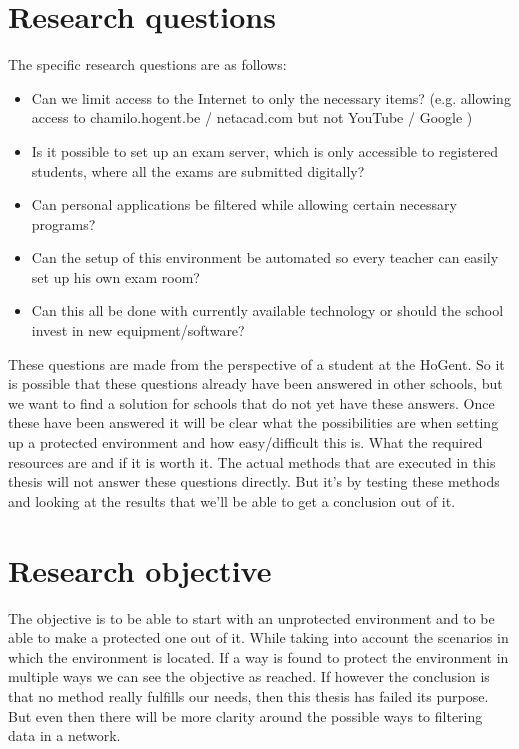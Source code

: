 \section{Research questions}
\label{sec:onderzoeksvraag}
The specific research questions are as follows:
\begin{itemize}
   \item Can we limit access to the Internet to only the necessary items? (e.g. allowing access to chamilo.hogent.be / netacad.com but not YouTube / Google )
   \item Is it possible to set up an exam server, which is only accessible to registered students, where all the exams are submitted digitally?
   \item Can personal applications be filtered while allowing certain necessary programs?
   \item Can the setup of this environment be automated so every teacher can easily set up his own exam room?
   \item Can this all be done with currently available technology or should the school invest in new equipment/software?
\end{itemize}
These questions are made from the perspective of a student at the HoGent. So it is possible that these questions already have been answered in other schools, but we want to find a solution for schools that do not yet have these answers. Once these have been answered it will be clear what the possibilities are when setting up a protected environment and how easy/difficult this is. What the required resources are and if it is worth it. The actual methods that are executed in this thesis will not answer these questions directly. But it's by testing these methods and looking at the results that we'll be able to get a conclusion out of it.
\section{Research objective}
\label{sec:onderzoeksdoelstelling}
The objective is to be able to start with an unprotected environment and to be able to make a protected one out of it. While taking into account the scenarios in which the environment is located. If a way is found to protect the environment in multiple ways we can see the objective as reached. If however the conclusion is that no method really fulfills our needs, then this thesis has failed its purpose. But even then there will be more clarity around the possible ways to filtering data in a network.

